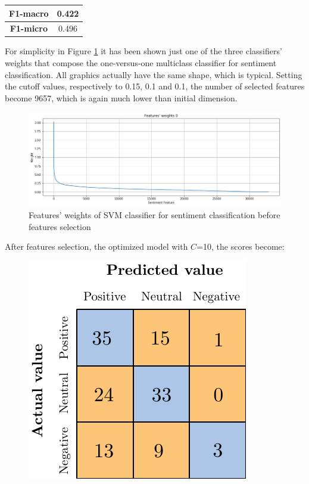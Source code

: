 \begin{center}
	\begin{tabular}{ | c | c | } 
		\hline
		\textbf{F1-macro} & 0.422 \\
		\hline
		\textbf{F1-micro} & 0.496 \\ 
		\hline
	\end{tabular}
\end{center}

For simplicity in Figure \ref{fig:ita_snt_svm_fs} it has been shown just one of the three classifiers' weights that compose the one-versus-one multiclass classifier for sentiment classification. All graphics actually have the same shape, which is typical. Setting the cutoff values, respectively to 0.15, 0.1 and 0.1, the number of selected features become 9657, which is again much lower than initial dimension.

\begin{figure}[H]
	\centering
	\includegraphics[width=\textwidth]{figures/conf_matrices/ita_snt_svm/ita_snt_svm_fs.png}
	\caption{Features' weights of SVM classifier for sentiment classification before features selection}
	\label{fig:ita_snt_svm_fs}
\end{figure}

After features selection, the optimized model with $C$=10, the scores become:
\begin{figure}[H]
	\centering
	\includegraphics[scale=1]{figures/conf_matrices/ita_snt_svm/ita_snt_svm_afs.pdf}
	\label{fig:ita_snt_svm_afs}
\end{figure}

